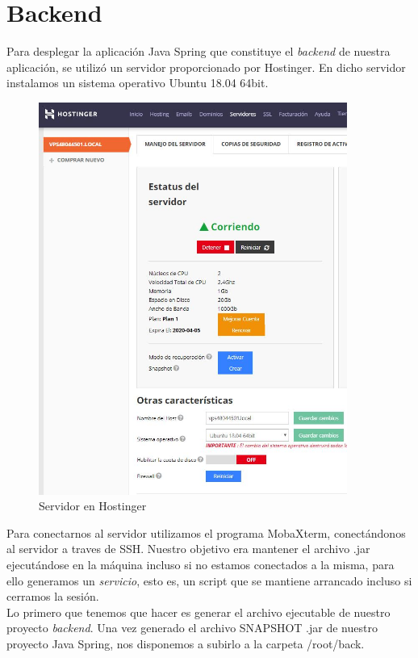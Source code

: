     \section{Backend}
    Para desplegar la aplicación Java Spring que constituye el \textit{backend} de nuestra aplicación, se utilizó un servidor proporcionado por Hostinger\cite{hostinger}. En dicho servidor instalamos un sistema operativo Ubuntu 18.04 64bit.
    
     \begin{figure}[h]
    \centering
     \includegraphics[width=0.9\textwidth]{images/servidorhostinger}
    \caption{Servidor en Hostinger}
    \end{figure}
    
    \FloatBarrier
    
    Para conectarnos al servidor utilizamos el programa MobaXterm, conectándonos al servidor a traves de SSH. Nuestro objetivo era mantener el archivo .jar ejecutándose en la máquina incluso si no estamos conectados a la misma, para ello generamos un \textit{servicio}, esto es, un script que se mantiene arrancado incluso si cerramos la sesión. \\
    \newline
    Lo primero que tenemos que hacer es generar el archivo ejecutable de nuestro proyecto \textit{backend}. Una vez generado el archivo SNAPSHOT .jar de nuestro proyecto Java Spring, nos disponemos a subirlo a la carpeta /root/back.
    
